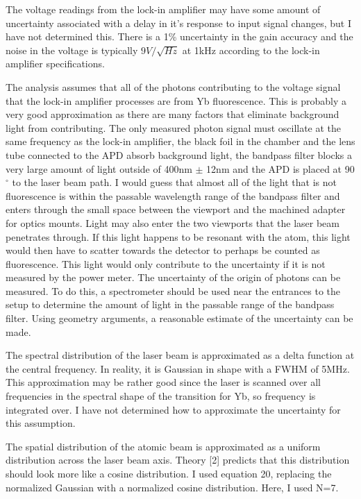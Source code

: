 \documentclass[12pt, a4paper]{article}
\begin{document}
The voltage readings from the lock-in amplifier may have some amount of uncertainty associated with a delay in it's response to input signal changes, but I have not determined this. There is a 1\% uncertainty in the gain accuracy and the noise in the voltage is typically $9V/\sqrt{Hz}$ at 1kHz according to the lock-in amplifier specifications. 

The analysis assumes that all of the photons contributing to the voltage signal that the lock-in amplifier processes are from Yb fluorescence. This is probably a very good approximation as there are many factors that eliminate background light from contributing. The only measured photon signal must oscillate at the same frequency as the lock-in amplifier, the black foil in the chamber and the lens tube connected to the APD absorb background light, the bandpass filter blocks a very large amount of light outside of 400nm $\pm$ 12nm and the APD is placed at 90$^{\circ}$ to the laser beam path. I would guess that almost all of the light that is not fluorescence is within the passable wavelength range of the bandpass filter and enters through the small space between the viewport and the machined adapter for optics mounts. Light may also enter the two viewports that the laser beam penetrates through. If this light happens to be resonant with the atom, this light would then have to scatter towards the detector to perhaps be counted as fluorescence. This light would only contribute to the uncertainty if it is not measured by the power meter. The uncertainty of the origin of photons can be measured. To do this, a spectrometer should be used near the entrances to the setup to determine the amount of light in the passable range of the bandpass filter. Using geometry arguments, a reasonable estimate of the uncertainty can be made.


The spectral distribution of the laser beam is approximated as a delta function at the central frequency. In reality, it is Gaussian in shape with a FWHM of 5MHz. This approximation may be rather good since the laser is scanned over all frequencies in the spectral shape of the transition for Yb, so frequency is integrated over. I have not determined how to approximate the uncertainty for this assumption.

The spatial distribution of the atomic beam is approximated as a uniform distribution across the laser beam axis. Theory [2] predicts that this distribution should look more like a cosine distribution. I used equation 20, replacing the normalized Gaussian with a normalized cosine distribution. Here, I used N=7.
\end{document}
